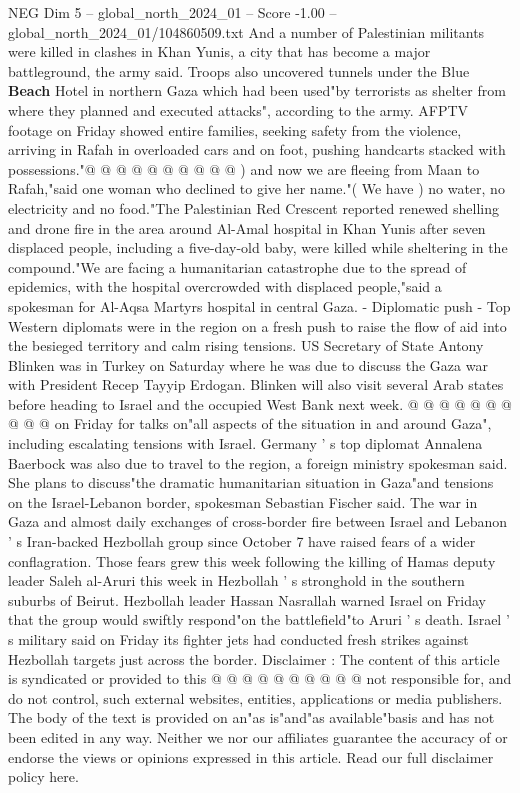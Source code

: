 \begin{textsample}{NEG Dim 5 – global\_north\_2024\_01 – Score -1.00 – global\_north\_2024\_01/104860509.txt}
And a number of Palestinian militants were killed in clashes in Khan Yunis, a city that has become a major battleground, the army said.
Troops also uncovered tunnels under the Blue \textbf{Beach} Hotel in northern Gaza which had been used"by terrorists as shelter from where they planned and executed attacks", according to the army.
AFPTV footage on Friday showed entire families, seeking safety from the violence, arriving in Rafah in overloaded cars and on foot, pushing handcarts stacked with possessions."@ @ @ @ @ @ @ @ @ @ ) and now we are fleeing from Maan to Rafah,"said one woman who declined to give her name."( We have ) no water, no electricity and no food."The Palestinian Red Crescent reported renewed shelling and drone fire in the area around Al-Amal hospital in Khan Yunis after seven displaced people, including a five-day-old baby, were killed while sheltering in the compound."We are facing a humanitarian catastrophe due to the spread of epidemics, with the hospital overcrowded with displaced people,"said a spokesman for Al-Aqsa Martyrs hospital in central Gaza. - Diplomatic push - Top Western diplomats were in the region on a fresh push to raise the flow of aid into the besieged territory and calm rising tensions.
US Secretary of State Antony Blinken was in Turkey on Saturday where he was due to discuss the Gaza war with President Recep Tayyip Erdogan.
Blinken will also visit several Arab states before heading to Israel and the occupied West Bank next week. @ @ @ @ @ @ @ @ @ @ on Friday for talks on"all aspects of the situation in and around Gaza", including escalating tensions with Israel.
Germany ' s top diplomat Annalena Baerbock was also due to travel to the region, a foreign ministry spokesman said.
She plans to discuss"the dramatic humanitarian situation in Gaza"and tensions on the Israel-Lebanon border, spokesman Sebastian Fischer said.
The war in Gaza and almost daily exchanges of cross-border fire between Israel and Lebanon ' s Iran-backed Hezbollah group since October 7 have raised fears of a wider conflagration.
Those fears grew this week following the killing of Hamas deputy leader Saleh al-Aruri this week in Hezbollah ' s stronghold in the southern suburbs of Beirut.
Hezbollah leader Hassan Nasrallah warned Israel on Friday that the group would swiftly respond"on the battlefield"to Aruri ' s death.
Israel ' s military said on Friday its fighter jets had conducted fresh strikes against Hezbollah targets just across the border.
Disclaimer : The content of this article is syndicated or provided to this @ @ @ @ @ @ @ @ @ @ not responsible for, and do not control, such external websites, entities, applications or media publishers.
The body of the text is provided on an"as is"and"as available"basis and has not been edited in any way.
Neither we nor our affiliates guarantee the accuracy of or endorse the views or opinions expressed in this article.
Read our full disclaimer policy here.

\end{textsample}
